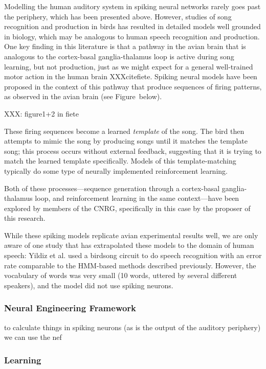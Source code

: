 \documentclass{article}
\begin{document}
Modelling the human auditory system
in spiking neural networks
rarely goes past the periphery,
which has been presented above.
However, studies of
song recognition and production
in birds has resulted in
detailed models well grounded
in biology, which may be analogous
to human speech recognition and production.
One key finding in this literature
is that a pathway in the avian brain
that is analogous to
the cortex-basal ganglia-thalamus loop
is active during song learning,
but not production,
just as we might expect
for a general well-trained motor action
in the human brain
XXXcitefiete.
Spiking neural models have been proposed
in the context of this pathway
that produce sequences of firing patterns,
as observed in the avian brain (see Figure~below).

XXX: figure1+2 in fiete

These firing sequences become
a learned \textit{template} of the song.
The bird then attempts to mimic the song
by producing songs until it matches
the template song;
this process occurs without
external feedback,
suggesting that it is trying
to match the learned template specifically.
Models of this template-matching
typically do some type of neurally
implemented reinforcement learning.

Both of these processes---sequence generation
through a cortex-basal ganglia-thalamus loop,
and reinforcement learning in the same context---have
been explored by members of the CNRG,
specifically in this case by
the proposer of this research.

While these spiking models
replicate avian experimental results well,
we are only aware of one study that
has extrapolated these models
to the domain of human speech:
Yildiz et al. used a birdsong
circuit to do speech recognition
with an error rate comparable
to the HMM-based methods described previously.
However, the vocabulary of words was very small
(10 words, uttered by several different speakers),
and the model did not use spiking neurons.

\subsubsection{Neural Engineering Framework}

to calculate things in spiking neurons
(as is the output of the auditory periphery)
we can use the nef

\subsubsection{Learning}
\end{document}
